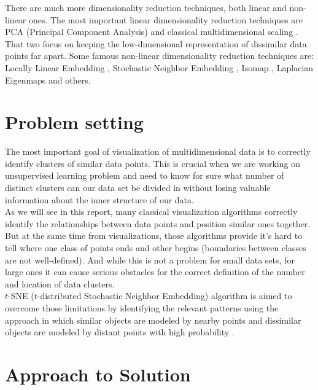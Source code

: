 There are much more dimensionality reduction techniques, both linear and non-linear ones. The most important linear dimensionality reduction techniques are PCA (Principal Component Analysis)\cite{pca} and classical multidimensional scaling \cite{mds}. That two focus on keeping the low-dimensional representation of dissimilar data points far apart. Some famous non-linear dimensionality reduction techniques are: Locally Linear Embedding \cite{lle}, Stochastic Neighbor Embedding \cite{snearticle}, Isomap \cite{isomap}, Laplacian Eigenmaps \cite{lapeig} and others.

\section{Problem setting}

The most important goal of visualization of multidimensional data is to correctly identify clusters of similar data points. This is crucial when we are working on unsupervised learning problem and need to know for sure what number of distinct clusters can our data set be divided in without losing valuable information about the inner structure of our data.\\

As we will see in this report, many classical visualization algorithms correctly identify the relationships between data points and position similar ones together. But at the same time from visualizations, those algorithms provide it's hard to tell where one class of points ends and other begins (boundaries between classes are not well-defined). And while this is not a problem for small data sets, for large ones it can cause serious obstacles for the correct definition of the number and location of data clusters. \\

$t$-SNE ($t$-distributed Stochastic Neighbor Embedding) algorithm is aimed to overcome those limitations by identifying the relevant patterns using the approach in which similar objects are modeled by nearby points and dissimilar objects are modeled by distant points with high probability \cite{tsnearticle}. 

\section{Approach to Solution}

